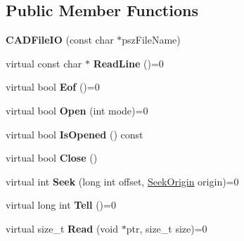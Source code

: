 \subsection*{Public Member Functions}
\begin{DoxyCompactItemize}
\item 
{\bfseries C\+A\+D\+File\+IO} (const char $\ast$psz\+File\+Name)\hypertarget{class_c_a_d_file_i_o_aa57658d4c091348ed0e8ee83839e4b38}{}\label{class_c_a_d_file_i_o_aa57658d4c091348ed0e8ee83839e4b38}

\item 
virtual const char $\ast$ {\bfseries Read\+Line} ()=0\hypertarget{class_c_a_d_file_i_o_a60790ed49f2d9e2227e175d2c4b93941}{}\label{class_c_a_d_file_i_o_a60790ed49f2d9e2227e175d2c4b93941}

\item 
virtual bool {\bfseries Eof} ()=0\hypertarget{class_c_a_d_file_i_o_a078e8e9e04c2e0e95d7a23c580d35057}{}\label{class_c_a_d_file_i_o_a078e8e9e04c2e0e95d7a23c580d35057}

\item 
virtual bool {\bfseries Open} (int mode)=0\hypertarget{class_c_a_d_file_i_o_a8787c68af68fdcfd4032f0009360e682}{}\label{class_c_a_d_file_i_o_a8787c68af68fdcfd4032f0009360e682}

\item 
virtual bool {\bfseries Is\+Opened} () const \hypertarget{class_c_a_d_file_i_o_aeefa9bdc1b424cd536994b83d84098bc}{}\label{class_c_a_d_file_i_o_aeefa9bdc1b424cd536994b83d84098bc}

\item 
virtual bool {\bfseries Close} ()\hypertarget{class_c_a_d_file_i_o_a1d704902febf2642246d78e83190b5ce}{}\label{class_c_a_d_file_i_o_a1d704902febf2642246d78e83190b5ce}

\item 
virtual int {\bfseries Seek} (long int offset, \hyperlink{class_c_a_d_file_i_o_ac02f709414ed2d228f8dfdabb4eb1b4f}{Seek\+Origin} origin)=0\hypertarget{class_c_a_d_file_i_o_aeef35becc5396734f635e8b1c0465f62}{}\label{class_c_a_d_file_i_o_aeef35becc5396734f635e8b1c0465f62}

\item 
virtual long int {\bfseries Tell} ()=0\hypertarget{class_c_a_d_file_i_o_af52fda7fe054d1dd5ca0fca8790f9369}{}\label{class_c_a_d_file_i_o_af52fda7fe054d1dd5ca0fca8790f9369}

\item 
virtual size\+\_\+t {\bfseries Read} (void $\ast$ptr, size\+\_\+t size)=0\hypertarget{class_c_a_d_file_i_o_a5b7ade5ba5ac0e283a984542ebcfb401}{}\label{class_c_a_d_file_i_o_a5b7ade5ba5ac0e283a984542ebcfb401}


\end{DoxyCompactItemize}
